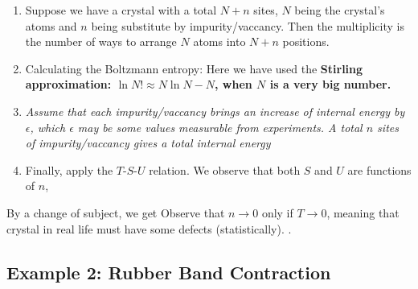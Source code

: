 \documentclass[class=article, crop=false, 12pt]{standalone}
\begin{document}
\begin{enumerate}
    \item Suppose we have a crystal with a total $N+n$ sites,
    $N$ being the crystal's atoms and $n$ being substitute by impurity/vaccancy.
    Then the multiplicity is the number of ways to arrange $N$ atoms into $N+n$ positions.

    \item Calculating the Boltzmann entropy:
    Here we have used the \bf{Stirling approximation}:
    $\ln N! \approx N\ln N - N$, when $N$ is a very big number.

    \item \it{Assume} that each impurity/vaccancy brings an increase of internal energy by $\epsilon$,
    which $\epsilon$ may be some values measurable from experiments.
    A total $n$ sites of impurity/vaccancy gives a total internal energy 

    \item Finally, apply the $T$-$S$-$U$ relation.
    We observe that both $S$ and $U$ are functions of $n$,
\end{enumerate}

By a change of subject, we get
Observe that $n\to 0$ only if $T\to 0$,
meaning that crystal in real life must have some defects (statistically).
.


\subsection{Example 2: Rubber Band Contraction}
\end{document}
